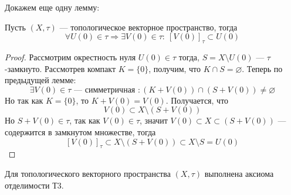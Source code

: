 Докажем еще одну лемму:
\begin{lemma}
	\label{lem:dest}
	Пусть $(X, \tau)$ --- топологическое векторное пространство, тогда 
	$$
	\forall U(0) \in \tau \Rightarrow \exists V(0) \in \tau: \ [V(0)]_\tau \subset U(0)
	$$
\end{lemma}
\begin{proof}
	Рассмотрим окрестность нуля $U(0) \in \tau$ тогда, $S = X\setminus U(0)$ --- $\tau$-замкнуто. Рассмотрев компакт $K = \{0\}$, получим, что $K \cap S = \varnothing$. Теперь по предыдущей лемме: 
	$$
	\exists V(0) \in \tau \text{ --- симметричная }: (K + V(0))\cap (S + V(0)) \neq \varnothing
	$$
	Но так как $K = \{0\}$, то $K + V(0) = V(0)$. Получается, что 
	$$
	V(0) \subset X \setminus (S + V(0))
	$$
	Но $S + V(0) \in \tau$, так как $V(0) \in \tau$, значит $V(0) \subset X \subset (S + V(0))$ --- содержится в замкнутом множестве, тогда 
	$$
	[V(0)]_\tau \subset X \setminus (S + V(0)) \subset X \setminus S = U(0)
	$$
\end{proof}
\begin{next0}
	Для топологического векторного пространства $(X, \tau)$ выполнена аксиома отделимости Т3.
\end{next0}
